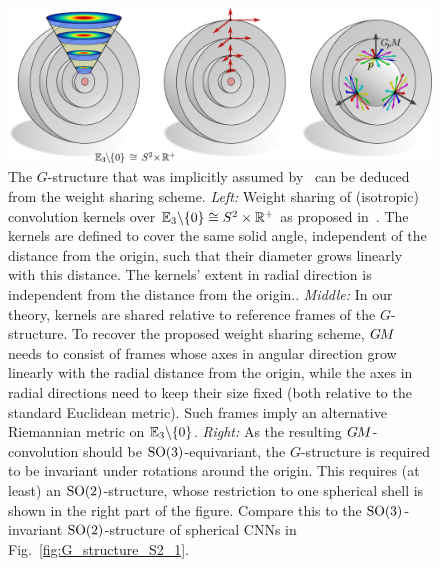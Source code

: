 \begin{figure}
    \centering
    \includegraphics[width=1.\textwidth]{figures/G_structure_R3_no_origin.pdf}
    \hfill
    \caption{\small
        The $G$-structure that was implicitly assumed by~\citet{ramasinghe2019representation} can be deduced from the weight sharing scheme.
        \emph{Left:}
            Weight sharing of (isotropic) convolution kernels over $\mathbb{E}_3 \backslash \{0\} \cong S^2 \times \mathbb{R}^+$ as proposed in~\cite{ramasinghe2019representation}.
            The kernels are defined to cover the same solid angle, independent of the distance from the origin, such that their diameter grows linearly with this distance.
            The kernels' extent in radial direction is independent from the distance from the origin..
        \emph{Middle:}
            In our theory, kernels are shared relative to reference frames of the $G$-structure.
            To recover the proposed weight sharing scheme, $G\mkern-1.4muM$ needs to consist of frames whose axes in angular direction grow linearly with the radial distance from the origin, while the axes in radial directions need to keep their size fixed (both relative to the standard Euclidean metric).
            Such frames imply an alternative Riemannian metric on $\mathbb{E}_3 \backslash \{0\}$.
        \emph{Right:}
            As the resulting $G\mkern-1.4muM$-convolution should be $\operatorname{SO}(3)$-equivariant, the $G$-structure is required to be invariant under rotations around the origin.
            This requires (at least) an $\operatorname{SO}(2)$-structure, whose restriction to one spherical shell is shown in the right part of the figure.
            Compare this to the $\operatorname{SO}(3)$-invariant $\operatorname{SO}(2)$-structure of spherical CNNs in Fig.~\ref{fig:G_structure_S2_1}.
    }
    \label{fig:G_structure_R3_no_origin}
\end{figure}


